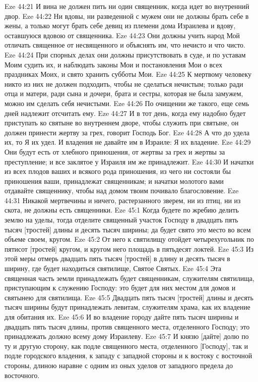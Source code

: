 Eze 44:21  И вина не должен пить ни один священник, когда идет во внутренний двор.
Eze 44:22  Ни вдовы, ни разведенной с мужем они не должны брать себе в жены, а только могут брать себе девиц из племени дома Израилева и вдову, оставшуюся вдовою от священника.
Eze 44:23  Они должны учить народ Мой отличать священное от несвященного и объяснять им, что нечисто и что чисто.
Eze 44:24  При спорных делах они должны присутствовать в суде, и по уставам Моим судить их, и наблюдать законы Мои и постановления Мои о всех праздниках Моих, и свято хранить субботы Мои.
Eze 44:25  К мертвому человеку никто из них не должен подходить, чтобы не сделаться нечистым; только ради отца и матери, ради сына и дочери, брата и сестры, которая не была замужем, можно им сделать себя нечистыми.
Eze 44:26  По очищении же такого, еще семь дней надлежит отсчитать ему.
Eze 44:27  И в тот день, когда ему надобно будет приступать ко святыне во внутреннем дворе, чтобы служить при святыне, он должен принести жертву за грех, говорит Господь Бог.
Eze 44:28  А что до удела их, то Я их удел. И владения не давайте им в Израиле: Я их владение.
Eze 44:29  Они будут есть от хлебного приношения, от жертвы за грех и жертвы за преступление; и все заклятое у Израиля им же принадлежит.
Eze 44:30  И начатки из всех плодов ваших и всякого рода приношения, из чего ни состояли бы приношения ваши, принадлежат священникам; и начатки молотого вами отдавайте священнику, чтобы над домом твоим почивало благословение.
Eze 44:31  Никакой мертвечины и ничего, растерзанного зверем, ни из птиц, ни из скота, не должны есть священники.
Eze 45:1  Когда будете по жребию делить землю на уделы, тогда отделите священный участок Господу в двадцать пять тысяч [тростей] длины и десять тысяч ширины; да будет свято это место во всем объеме своем, кругом.
Eze 45:2  От него к святилищу отойдет четырехугольник по пятисот [тростей] кругом, и кругом него площадь в пятьдесят локтей.
Eze 45:3  Из этой меры отмерь двадцать пять тысяч [тростей] в длину и десять тысяч в ширину, где будет находиться святилище, Святое Святых.
Eze 45:4  Эта священная часть земли принадлежать будет священникам, служителям святилища, приступающим к служению Господу: это будет для них местом для домов и святынею для святилища.
Eze 45:5  Двадцать пять тысяч [тростей] длины и десять тысяч ширины будут принадлежать левитам, служителям храма, как их владение для обитания их.
Eze 45:6  И во владение городу дайте пять тысяч ширины и двадцать пять тысяч длины, против священного места, отделенного Господу; это принадлежать должно всему дому Израилеву.
Eze 45:7  И князю [дайте] долю по ту и другую сторону, как подле священного места, отделенного [Господу], так и подле городского владения, к западу с западной стороны и к востоку с восточной стороны, длиною наравне с одним из оных уделов от западного предела до восточного.
